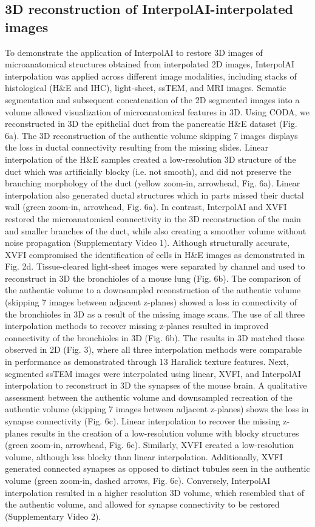 \begin{refsection}
    \section{3D reconstruction of InterpolAI-interpolated images}
    To demonstrate the application of InterpolAI to restore 3D images of microanatomical structures obtained from interpolated 2D images, InterpolAI interpolation was applied across different image modalities, including stacks of histological (H\&E and IHC), light-sheet, ssTEM, and MRI images. Sematic segmentation and subsequent concatenation of the 2D segmented images into a volume allowed visualization of microanatomical features in 3D.
    Using CODA, we reconstructed in 3D the epithelial duct from the pancreatic H\&E dataset (Fig. 6a). The 3D reconstruction of the authentic volume skipping 7 images displays the loss in ductal connectivity resulting from the missing slides. Linear interpolation of the H&E samples created a low-resolution 3D structure of the duct which was artificially blocky (i.e. not smooth), and did not preserve the branching morphology of the duct (yellow zoom-in, arrowhead, Fig. 6a). Linear interpolation also generated ductal structures which in parts missed their ductal wall (green zoom-in, arrowhead, Fig. 6a).  In contrast, InterpolAI and XVFI restored the microanatomical connectivity in the 3D reconstruction of the main and smaller branches of the duct, while also creating a smoother volume without noise propagation (Supplementary Video 1). Although structurally accurate, XVFI compromised the identification of cells in H\&E images as demonstrated in Fig. 2d.   
    Tissue-cleared light-sheet images were separated by channel and used to reconstruct in 3D the bronchioles of a mouse lung (Fig. 6b). The comparison of the authentic volume to a downsampled reconstruction of the authentic volume (skipping 7 images between adjacent z-planes) showed a loss in connectivity of the bronchioles in 3D as a result of the missing image scans. The use of all three interpolation methods to recover missing z-planes resulted in improved connectivity of the bronchioles in 3D (Fig. 6b). The results in 3D matched those observed in 2D (Fig. 3), where all three interpolation methods were comparable in performance as demonstrated through 13 Haralick texture features.   
    Next, segmented ssTEM images were interpolated using linear, XVFI, and InterpolAI interpolation to reconstruct in 3D the synapses of the mouse brain. A qualitative assessment between the authentic volume and downsampled recreation of the authentic volume (skipping 7 images between adjacent z-planes) shows the loss in synapse connectivity (Fig. 6c). Linear interpolation to recover the missing z-planes results in the creation of a low-resolution volume with blocky structures (green zoom-in, arrowhead, Fig. 6c). Similarly, XVFI created a low-resolution volume, although less blocky than linear interpolation. Additionally, XVFI generated connected synapses as opposed to distinct tubules seen in the authentic volume (green zoom-in, dashed arrows, Fig. 6c). Conversely, InterpolAI interpolation resulted in a higher resolution 3D volume, which resembled that of the authentic volume, and allowed for synapse connectivity to be restored (Supplementary Video 2).

\end{refsection}
